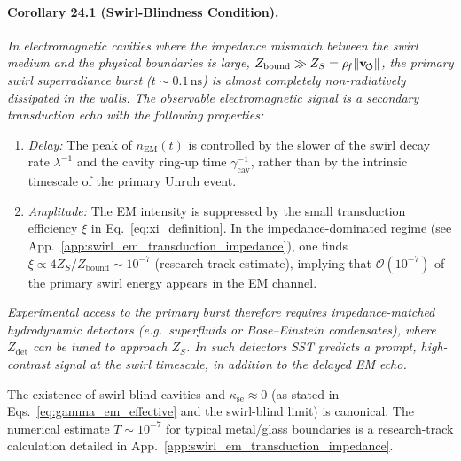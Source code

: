         \paragraph*{Corollary 24.1 (Swirl-Blindness Condition).}
            \label{cor:swirl_blindness}
            \emph{
            In electromagnetic cavities where the impedance mismatch between the swirl
            medium and the physical boundaries is large,
            $Z_{\mathrm{bound}} \gg Z_S = \rho_{\!f} \lVert\mathbf{v}_{\!\boldsymbol{\circlearrowleft}}\rVert$, the primary
            swirl superradiance burst ($t \sim 0.1\,\mathrm{ns}$) is almost completely
            non-radiatively dissipated in the walls. The observable electromagnetic signal
            is a secondary transduction echo with the following properties:
        }

            \begin{enumerate}
                \item \emph{Delay:} The peak of $n_{\mathrm{EM}}(t)$ is controlled by
                the slower of the swirl decay rate $\lambda^{-1}$ and the cavity
                ring-up time $\gamma_{\mathrm{cav}}^{-1}$, rather than by the
                intrinsic timescale of the primary Unruh event.
                \item \emph{Amplitude:} The EM intensity is suppressed by the small
                transduction efficiency $\xi$ in Eq.~\eqref{eq:xi_definition}.
                In the impedance-dominated regime (see App.~\ref{app:swirl_em_transduction_impedance}),
                one finds $\xi \propto 4 Z_S/Z_{\mathrm{bound}} \sim 10^{-7}$ (research-track estimate),
                implying that $\mathcal{O}(10^{-7})$ of the primary swirl energy appears in the
                EM channel.
            \end{enumerate}

            \emph{
            Experimental access to the primary burst therefore requires
            impedance-matched hydrodynamic detectors (e.g.\ superfluids or
            Bose--Einstein condensates), where $Z_{\mathrm{det}}$ can be tuned to
            approach $Z_S$. In such detectors SST predicts a prompt, high-contrast
            signal at the swirl timescale, in addition to the delayed EM echo.
        }

            The existence of swirl-blind cavities and $\kappa_{\text{se}} \approx 0$ (as stated in
            Eqs.~\eqref{eq:gamma_em_effective} and the swirl-blind limit) is canonical. The numerical
            estimate $T \sim 10^{-7}$ for typical metal/glass boundaries is a research-track
            calculation detailed in App.~\ref{app:swirl_em_transduction_impedance}.

